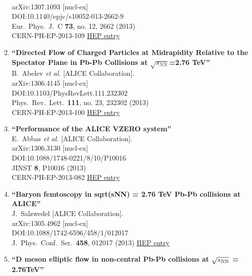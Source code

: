 \begin{enumerate}
  \\{}arXiv:1307.1093 [nucl-ex]
  \\{}DOI:10.1140/epjc/s10052-013-2662-9
  \\{}Eur.\ Phys.\ J.\ C {\bf 73}, no. 12, 2662 (2013)
  \\{}CERN-PH-EP-2013-109
\href{http://inspirehep.net/record/1241422}{HEP entry}
\item%
{\bf ``Directed Flow of Charged Particles at Midrapidity Relative to the Spectator Plane in Pb-Pb Collisions at $\sqrt{s_{NN}}$=2.76 TeV''}
  \\{}B.~Abelev {\it et al.} [ALICE Collaboration].
  \\{}arXiv:1306.4145 [nucl-ex]
  \\{}DOI:10.1103/PhysRevLett.111.232302
  \\{}Phys.\ Rev.\ Lett.\  {\bf 111}, no. 23, 232302 (2013)
  \\{}CERN-PH-EP-2013-100
\href{http://inspirehep.net/record/1238980}{HEP entry}
\item%
{\bf ``Performance of the ALICE VZERO system''}
  \\{}E.~Abbas {\it et al.} [ALICE Collaboration].
  \\{}arXiv:1306.3130 [nucl-ex]
  \\{}DOI:10.1088/1748-0221/8/10/P10016
  \\{}JINST {\bf 8}, P10016 (2013)
  \\{}CERN-PH-EP-2013-082
\href{http://inspirehep.net/record/1238451}{HEP entry}
\item%
{\bf ``Baryon femtoscopy in sqrt(sNN) = 2.76 TeV Pb-Pb collisions at ALICE''}
  \\{}J.~Salzwedel [ALICE Collaboration].
  \\{}arXiv:1305.4962 [nucl-ex]
  \\{}DOI:10.1088/1742-6596/458/1/012017
  \\{}J.\ Phys.\ Conf.\ Ser.\  {\bf 458}, 012017 (2013)
\href{http://inspirehep.net/record/1235026}{HEP entry}
\item%
{\bf ``D meson elliptic flow in non-central Pb-Pb collisions at $\sqrt{s_{\rm NN}}$ = 2.76TeV''}

\end{enumerate}
